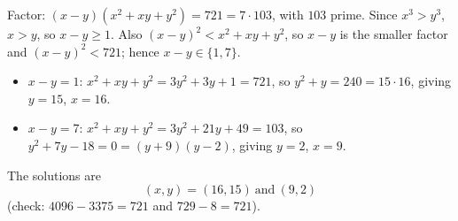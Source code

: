 Factor: $(x-y)(x^2+xy+y^2)=721=7\cdot103$, with $103$ prime. Since $x^3>y^3$, $x>y$, so $x-y\ge1$. Also $(x-y)^2<x^2+xy+y^2$, so $x-y$ is the smaller factor and $(x-y)^2<721$; hence $x-y\in\{1,7\}$.
\begin{itemize}
\item $x-y=1$: $x^2+xy+y^2=3y^2+3y+1=721$, so $y^2+y=240=15\cdot16$, giving $y=15$, $x=16$.
\item $x-y=7$: $x^2+xy+y^2=3y^2+21y+49=103$, so $y^2+7y-18=0=(y+9)(y-2)$, giving $y=2$, $x=9$.
\end{itemize}
The solutions are
\[
\boxed{(x,y)=(16,15)\ \text{and}\ (9,2)}
\]
(check: $4096-3375=721$ and $729-8=721$).
